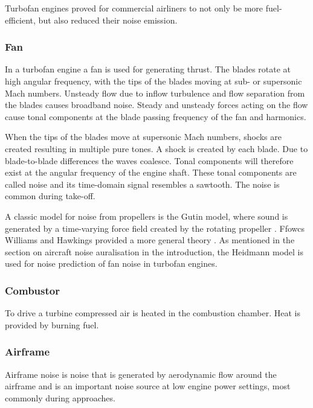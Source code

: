 Turbofan engines proved for commercial airliners to not only be more
fuel-efficient, but also reduced their noise emission.



\subsubsection{Fan}
In a turbofan engine a fan is used for generating thrust. The blades rotate at
high angular frequency, with the tips of the blades moving at sub- or supersonic
Mach numbers. Unsteady flow due to inflow turbulence and flow separation from
the blades causes broadband noise. Steady and unsteady forces acting on the flow
cause tonal components at the blade passing frequency of the fan and harmonics.

When the tips of the blades move at supersonic Mach numbers, shocks are created
resulting in multiple pure tones. A shock is created by each blade. Due to
blade-to-blade differences the waves coalesce. Tonal components will therefore
exist at the angular frequency of the engine shaft. These tonal components are
called  noise and its time-domain signal resembles a sawtooth.
The  noise is common during take-off.

A classic model for noise from propellers is the Gutin model, where sound is
generated by a time-varying force field created by the rotating propeller
. Ffowcs Williams and Hawkings provided a more general theory
. As mentioned in the section on aircraft noise auralisation in
the introduction, the Heidmann model is used for noise prediction of fan noise
in turbofan engines.

\subsubsection{Combustor}
To drive a turbine compressed air is heated in the combustion chamber. Heat is
provided by burning fuel.



\subsubsection{Airframe}
Airframe noise is noise that is generated by aerodynamic flow around the
airframe and is an important noise source at low engine power settings, most
commonly during approaches.






